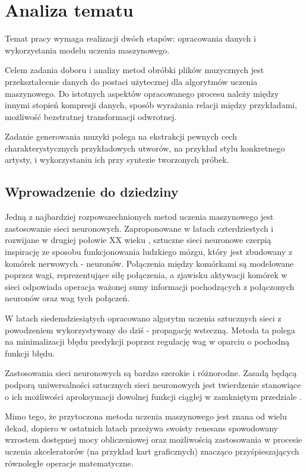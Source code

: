 \chapter{Analiza tematu}
{
  Temat pracy wymaga realizacji dwóch etapów: opracowania danych i\,\,wykorzystania modelu
  uczenia maszynowego.

  Celem zadania doboru i\,\,analizy metod obróbki plików muzycznych jest 
  przekształcenie danych do postaci użytecznej dla algorytmów uczenia maszynowego.
  Do istotnych aspektów opracowanego procesu należy między innymi stopień kompresji danych,
  sposób wyrażania relacji między przykładami, możliwość bezstratnej transformacji odwrotnej. 

  Zadanie generowania muzyki polega na ekstrakcji pewnych cech charakterystycznych
  przykładowych utworów, na przykład stylu konkretnego artysty, 
  i\,\,wykorzystaniu ich przy syntezie tworzonych próbek. 

  \section{Wprowadzenie do dziedziny}
  {
    Jedną z\,\,najbardziej rozpowszechnionych metod uczenia maszynowego jest zastosowanie sieci neuronowych.
    Zaproponowane w\,\,latach czterdziestych i\,\,rozwijane w\,\,drugiej połowie XX wieku \cite{McCulloch1943}, sztuczne sieci neuronowe
    czerpią inspirację ze sposobu funkcjonowania ludzkiego mózgu, który jest zbudowany z\,\,komórek nerwowych - neuronów.
    Połączenia między komórkami są modelowane poprzez wagi, reprezentujące siłę połączenia, a\,\,zjawisku aktywacji
    komórek w\,\,sieci odpowiada operacja ważonej sumy informacji pochodzących z\,\,połączonych neuronów oraz wag tych połączeń.
    
    W\,\,latach siedemdziesiątych opracowano algorytm uczenia sztucznych sieci z\,\,powodzeniem wykorzystywany
    do dziś - propagację wsteczną. Metoda ta polega na minimalizacji błędu predykcji poprzez regulację
    wag w\,\,oparciu o\,\,pochodną funkcji błędu.

    Zastosowania sieci neuronowych są bardzo szerokie i\,\,różnorodne. Zasadą będącą podporą uniwersalności 
    sztucznych sieci neuronowych jest twierdzenie stanowiące o\,\,ich możliwości aproksymacji dowolnej 
    funkcji ciągłej w\,\,zamkniętym przedziale \cite{Csji2001ApproximationWA}.

    Mimo tego, że przytoczona metoda uczenia maszynowego jest znana od wielu dekad, dopiero w\,\,ostatnich latach
    przeżywa swoisty renesans spowodowany wzrostem dostępnej mocy obliczeniowej oraz 
    możliwością zastosowania w\,\,procesie uczenia akceleratorów (na przykład kart graficznych) znacząco 
    przyśpieszających równoległe operacje matematyczne.


}}
